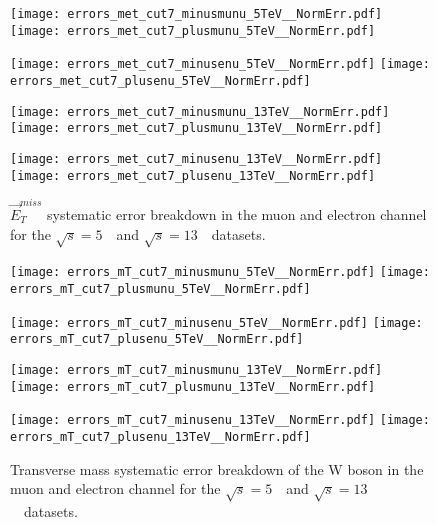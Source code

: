 \begin{figure}[h]
	\centering
	{\texttt{[image: errors\_met\_cut7\_minusmunu\_5TeV\_\_NormErr.pdf]}\label{f:}}
	{\texttt{[image: errors\_met\_cut7\_plusmunu\_5TeV\_\_NormErr.pdf]}\label{f:}}
	
	{\texttt{[image: errors\_met\_cut7\_minusenu\_5TeV\_\_NormErr.pdf]}\label{f:}}
	{\texttt{[image: errors\_met\_cut7\_plusenu\_5TeV\_\_NormErr.pdf]}\label{f:}}
	
		{\texttt{[image: errors\_met\_cut7\_minusmunu\_13TeV\_\_NormErr.pdf]}\label{f:}}
	{\texttt{[image: errors\_met\_cut7\_plusmunu\_13TeV\_\_NormErr.pdf]}\label{f:}}
	
	{\texttt{[image: errors\_met\_cut7\_minusenu\_13TeV\_\_NormErr.pdf]}\label{f:}}
	{\texttt{[image: errors\_met\_cut7\_plusenu\_13TeV\_\_NormErr.pdf]}\label{f:}}
	\caption{ $\vec{E}^{miss}_{T}$ systematic error breakdown in the muon and electron channel  for the $\sqrt{s} = 5$~\TeV\ and $\sqrt{s} = 13$~\TeV\ datasets.}
\end{figure}
\newpage



\begin{figure}[h]
	\centering
	{\texttt{[image: errors\_mT\_cut7\_minusmunu\_5TeV\_\_NormErr.pdf]}\label{f:}}
	{\texttt{[image: errors\_mT\_cut7\_plusmunu\_5TeV\_\_NormErr.pdf]}\label{f:}}
	
	{\texttt{[image: errors\_mT\_cut7\_minusenu\_5TeV\_\_NormErr.pdf]}\label{f:}}
	{\texttt{[image: errors\_mT\_cut7\_plusenu\_5TeV\_\_NormErr.pdf]}\label{f:}}
	
		{\texttt{[image: errors\_mT\_cut7\_minusmunu\_13TeV\_\_NormErr.pdf]}\label{f:}}
	{\texttt{[image: errors\_mT\_cut7\_plusmunu\_13TeV\_\_NormErr.pdf]}\label{f:}}
	
	{\texttt{[image: errors\_mT\_cut7\_minusenu\_13TeV\_\_NormErr.pdf]}\label{f:}}
	{\texttt{[image: errors\_mT\_cut7\_plusenu\_13TeV\_\_NormErr.pdf]}\label{f:}}
	
	\caption{  Transverse mass systematic error breakdown of the W boson in the muon and electron channel  for the $\sqrt{s} = 5$~\TeV\ and $\sqrt{s} = 13$~\TeV\ datasets.} \end{figure}
\newpage


